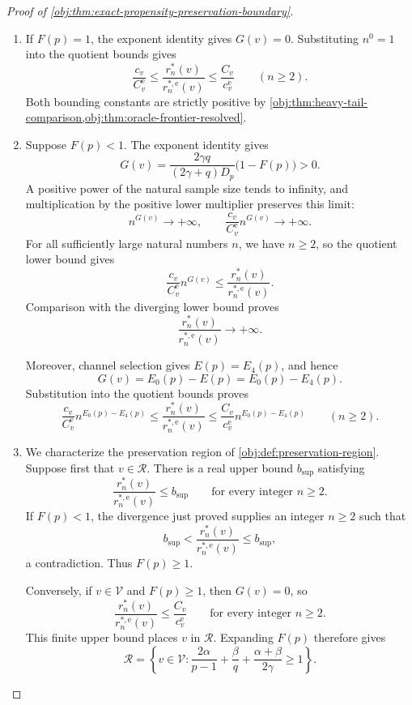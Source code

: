 \begin{proof}[Proof of \cref{obj:thm:exact-propensity-preservation-boundary}]
\begin{enumerate}
\item If \(F(p)=1\), the exponent identity gives \(G(v)=0\). Substituting \(n^0=1\) into the quotient bounds gives
\[
\frac{c_v}{C^{\mathrm e}_v}
\le
\frac{r_n^*(v)}{r_n^{*,\mathrm e}(v)}
\le
\frac{C_v}{c^{\mathrm e}_v}
\qquad(n\ge2).
\]
Both bounding constants are strictly positive by \cref{obj:thm:heavy-tail-comparison,obj:thm:oracle-frontier-resolved}.

\item Suppose \(F(p)<1\). The exponent identity gives
\[
G(v)=
\frac{2\gamma q}{(2\gamma+q)D_p}\bigl(1-F(p)\bigr)>0.
\]
A positive power of the natural sample size tends to infinity, and multiplication by the positive lower multiplier preserves this limit:
\[
n^{G(v)}\longrightarrow+\infty,
\qquad
\frac{c_v}{C^{\mathrm e}_v}n^{G(v)}
\longrightarrow+\infty.
\]
For all sufficiently large natural numbers \(n\), we have \(n\ge2\), so the quotient lower bound gives
\[
\frac{c_v}{C^{\mathrm e}_v}n^{G(v)}
\le
\frac{r_n^*(v)}{r_n^{*,\mathrm e}(v)}.
\]
Comparison with the diverging lower bound proves
\[
\frac{r_n^*(v)}{r_n^{*,\mathrm e}(v)}
\longrightarrow+\infty.
\]

Moreover, channel selection gives \(E(p)=E_4(p)\), and hence
\[
G(v)=E_0(p)-E(p)=E_0(p)-E_4(p).
\]
Substitution into the quotient bounds proves
\[
\frac{c_v}{C^{\mathrm e}_v}n^{E_0(p)-E_4(p)}
\le
\frac{r_n^*(v)}{r_n^{*,\mathrm e}(v)}
\le
\frac{C_v}{c^{\mathrm e}_v}n^{E_0(p)-E_4(p)}
\qquad(n\ge2).
\]

\item We characterize the preservation region of
\cref{obj:def:preservation-region}. Suppose first that \(v\in\mathcal R\).
There is a real upper bound \(b_{\mathrm{sup}}\) satisfying
\[
\frac{r_n^*(v)}{r_n^{*,\mathrm e}(v)}
\le b_{\mathrm{sup}}
\qquad\text{for every integer }n\ge2.
\]
If \(F(p)<1\), the divergence just proved supplies an integer \(n\ge2\) such that
\[
b_{\mathrm{sup}}
<
\frac{r_n^*(v)}{r_n^{*,\mathrm e}(v)}
\le b_{\mathrm{sup}},
\]
a contradiction. Thus \(F(p)\ge1\).

Conversely, if \(v\in\mathcal V\) and \(F(p)\ge1\), then \(G(v)=0\), so
\[
\frac{r_n^*(v)}{r_n^{*,\mathrm e}(v)}
\le\frac{C_v}{c^{\mathrm e}_v}
\qquad\text{for every integer }n\ge2.
\]
This finite upper bound places \(v\) in \(\mathcal R\). Expanding \(F(p)\) therefore gives
\[
\mathcal R
=
\left\{v\in\mathcal V:
\frac{2\alpha}{p-1}
+\frac{\beta}{q}
+\frac{\alpha+\beta}{2\gamma}\ge1
\right\}.
\]


\end{enumerate}
\end{proof}
